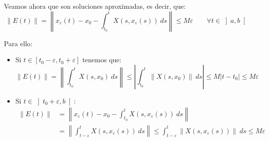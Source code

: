 \noindent
Veamos ahora que son soluciones aproximadas, es decir, que:
\begin{equation*}
    \|E(t)\| = \left\|x_{\varepsilon}(t) -x_0- \int_{t_0}^{t} X(s,x_{\varepsilon}(s))~ds \right\| \leq M \varepsilon \qquad \forall t\in \left]a,b\right[
\end{equation*}

Para ello:
\begin{itemize}
    \item Si $t\in [t_0-\varepsilon,t_0+\varepsilon]$ tenemos que:
        \begin{equation*}
            \|E(t)\| = \left\|\int_{t_0}^{t} X(s,x_0)~ds \right\| \leq \left|\int_{t_0}^{t} \|X(s,x_0)\|~ds \right| \leq M|t-t_0| \leq M\varepsilon
        \end{equation*}
    \item Si $t\in \left]t_0+\varepsilon,b\right[$:
        \begin{align*}
            \|E(t)\| &= \left\|x_{\varepsilon}(t)-x_0- \int_{t_0}^{t} X(s,x_{\varepsilon}(s))~ds  \right\| \\ 
                     &= \left\|\int_{t-\varepsilon}^{t} X(s,x_{\varepsilon}(s))~ds \right\| \leq \int_{t-\varepsilon}^{t} \|X(s,x_{\varepsilon}(s))\|~ds  \leq M\varepsilon
        \end{align*}
\end{itemize}

